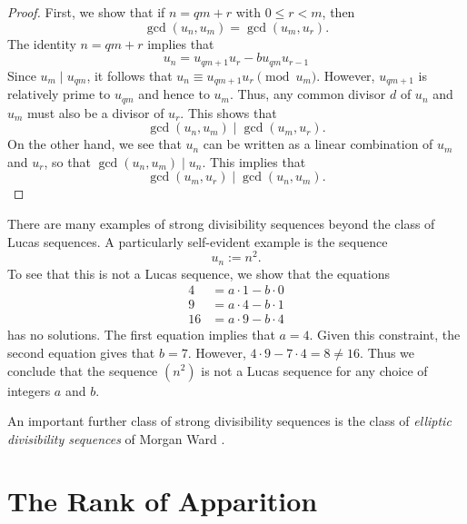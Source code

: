 \begin{proof}
  First, we show that if $n=qm+r$ with $0\leq r<m$, then
  \begin{equation*}
    \gcd(u_n,u_m)=\gcd(u_m,u_r). 
  \end{equation*}
  The identity $n=qm+r$ implies that
  \begin{equation*}
    u_{n}=u_{qm+1} u_{r}-b u_{qm}u_{r-1}
  \end{equation*}
  Since $u_m\mid u_{qm}$, it follows that $u_n\equiv u_{qm+1}u_r\pmod{u_m}$. However, $u_{qm+1}$ is relatively prime to $u_{qm}$ and hence to $u_m$. Thus, any common divisor $d$ of $u_n$ and $u_m$ must also be a divisor of $u_r$. This shows that
  \begin{equation*}
    \gcd(u_n,u_m) \mid \gcd(u_m,u_r).
  \end{equation*}
  On the other hand, we see that $u_n$ can be written as a linear combination of $u_m$ and $u_r$, so that $\gcd(u_n,u_m)\mid u_n$. This implies that
  \begin{equation*}
    \gcd(u_m,u_r)\mid \gcd(u_n,u_m).
  \end{equation*}
\end{proof}

\begin{example}
  There are many examples of strong divisibility sequences beyond the class of Lucas sequences. A particularly self-evident example is the sequence
  \begin{equation*}
    u_n:=n^2.
  \end{equation*}
  To see that this is not a Lucas sequence, we show that the equations
  \begin{align*}
    4 & = a\cdot 1 - b\cdot 0 \\
    9 & = a\cdot 4 - b\cdot 1 \\
    16 & = a \cdot 9 - b\cdot 4
  \end{align*}
  has no solutions. The first equation implies that $a=4$. Given this constraint, the second equation gives that $b=7$. However, $4\cdot 9-7\cdot 4= 8\neq 16$. Thus we conclude that the sequence $(n^2)$ is not a Lucas sequence for any choice of integers $a$ and $b$.

  An important further class of strong divisibility sequences is the class of \emph{elliptic divisibility sequences} of Morgan Ward \cite{ward1948}.
\end{example}

\section{The Rank of Apparition}

